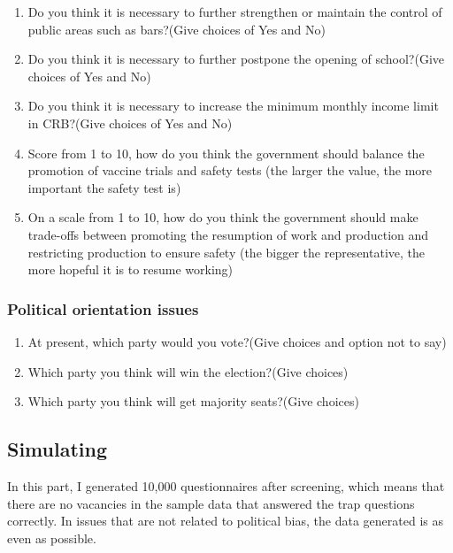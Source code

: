 \documentclass[
]{article}
\begin{document}
\begin{enumerate}
\def\labelenumi{(\arabic{enumi})}
\setcounter{enumi}{7}
\item
  Do you think it is necessary to further strengthen or maintain the
  control of public areas such as bars?(Give choices of Yes and No)
\item
  Do you think it is necessary to further postpone the opening of
  school?(Give choices of Yes and No)
\item
  Do you think it is necessary to increase the minimum monthly income
  limit in CRB?(Give choices of Yes and No)
\item
  Score from 1 to 10, how do you think the government should balance the
  promotion of vaccine trials and safety tests (the larger the value,
  the more important the safety test is)
\item
  On a scale from 1 to 10, how do you think the government should make
  trade-offs between promoting the resumption of work and production and
  restricting production to ensure safety (the bigger the
  representative, the more hopeful it is to resume working)
\end{enumerate}

\hypertarget{political-orientation-issues}{%
\subsubsection{Political orientation
issues}\label{political-orientation-issues}}

\begin{enumerate}
\def\labelenumi{(\arabic{enumi})}
\setcounter{enumi}{12}
\item
  At present, which party would you vote?(Give choices and option not to
  say)
\item
  Which party you think will win the election?(Give choices)
\item
  Which party you think will get majority seats?(Give choices)
\end{enumerate}

\hypertarget{simulating}{%
\subsection{Simulating}\label{simulating}}

In this part, I generated 10,000 questionnaires after screening, which
means that there are no vacancies in the sample data that answered the
trap questions correctly. In issues that are not related to political
bias, the data generated is as even as possible.
\end{document}
